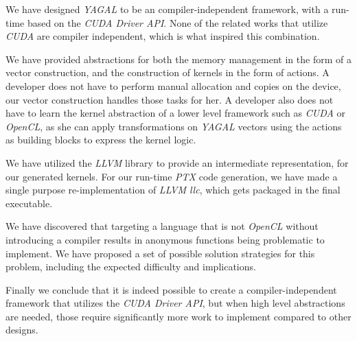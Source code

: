 We have designed \textit{YAGAL} to be an compiler-independent framework, with a run-time based on the \textit{CUDA Driver API}. None of the related works that utilize \textit{CUDA} are compiler independent, which is what inspired this combination.

We have provided abstractions for both the memory management in the form of a vector construction, and the construction of kernels in the form of actions. A developer does not have to perform manual allocation and copies on the device, our vector construction handles those tasks for her. A developer also does not have to learn the kernel abstraction of a lower level framework such as \textit{CUDA} or \textit{OpenCL}, as she can apply transformations on \textit{YAGAL} vectors using the actions as building blocks to express the kernel logic.

We have utilized the \textit{LLVM} library to provide an intermediate representation, for our generated kernels. For our run-time \textit{PTX} code generation, we have made a single purpose re-implementation of \textit{LLVM llc}, which gets packaged in the final executable.

We have discovered that targeting a language that is not \textit{OpenCL} without introducing a compiler results in anonymous functions being problematic to implement. We have proposed a set of possible solution strategies for this problem, including the expected difficulty and implications.

Finally we conclude that it is indeed possible to create a compiler-independent framework that utilizes the \textit{CUDA Driver API}, but when high level abstractions are needed, those require significantly more work to implement compared to other designs.
